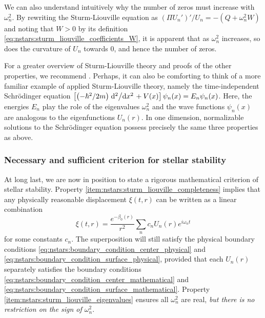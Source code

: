 We can also understand intuitively why the number of zeros must increase with $\omega_n^2$.
By rewriting the Sturm-Liouville equation as $\left( \Pi U_n' \right)' / U_n = - \left( Q + \omega_n^2 W \right)$ and noting that $W > 0$ by its definition \eqref{eq:nstars:sturm_liouville_coefficients_W}, it is apparent that as $\omega_n^2$ increases, so does the curvature of $U_n$ towards $0$, and hence the number of zeros.

For a greater overview of Sturm-Liouville theory and proofs of the other properties, we recommend \cite{ref:morse_feshbach}.
Perhaps, it can also be comforting to think of a more familiar example of applied Sturm-Liouville theory, namely the time-independent Schrödinger equation $\left[ \left(-\hbar^2/2m\right)\odv[2]{}/{x} + V(x) \right] \psi_n(x) = E_n \psi_n(x)$.
Here, the energies $E_n$ play the role of the eigenvalues $\omega_n^2$ and the wave functions $\psi_n(x)$ are analogous to the eigenfunctions $U_n(r)$.
In one dimension, normalizable solutions to the Schrödinger equation possess precisely the same three properties as above.

\iffalse
We can give a quick proof of the first part.
Property \eqref{eq:nstars:inner_product_hermitean} implies that $-\omega_n^2 \braket{W U_n  | U_m} = -\omega_m^2 \braket{W U_m | U_n}$, so $\left( \omega_m^2 - \omega_n^2 \right) \braket{W U_m | U_n} = 0$.
If $U_m = U_n$ are equal, then $\braket{W U_m | U_n} \neq 0$, so $\omega_m^2 = \omega_n^2$ must be equal.
On the other hand, if $\omega_m^2 \neq \omega_n^2$, then $\braket{W U_m | U_n} = 0$, and $U_m \neq U_n$ must be different.
\fi

\subsubsection{Necessary and sufficient criterion for stellar stability}

At long last, we are now in position to state a rigorous mathematical criterion of stellar stability.
Property \ref{item:nstars:sturm_liouville_completeness} implies that any physically reasonable displacement $\xi(t,r)$ can be written as a linear combination
\begin{equation}
	\xi(t,r) = \frac{e^{-\beta_0(r)}}{r^2} \sum_n c_n U_n(r) e^{i \omega_n t}
\label{eq:nstars:displacement_general_solution}
\end{equation}
for some constants $c_n$.
The superposition will still satisfy the physical boundary conditions \eqref{eq:nstars:boundary_condition_center_physical} and \eqref{eq:nstars:boundary_condition_surface_physical}, provided that each $U_n(r)$ separately satisfies the boundary conditions \eqref{eq:nstars:boundary_condition_center_mathematical} and \eqref{eq:nstars:boundary_condition_surface_mathematical}.
Property \ref{item:nstars:sturm_liouville_eigenvalues} ensures all $\omega_n^2$ are real, \emph{but there is no restriction on the sign of $\omega_n^2$}.

